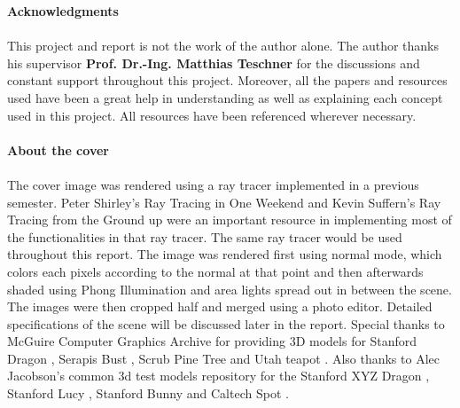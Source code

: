 \documentclass[11pt,a4paper]{article}
\begin{document}
\noindent
\textbf{\Large{Acknowledgments}}
\\~\\
This project and report is not the work of the author alone. The author thanks his supervisor \textbf{Prof.
	Dr.-Ing. Matthias Teschner} for the discussions and constant support throughout this project. Moreover, all the papers and resources used have been a great help in understanding as well as explaining each concept used in this project. All resources have been referenced wherever necessary.
\\~\\
\noindent
\textbf{\Large{About the cover}}
\\~\\
The cover image was rendered using a ray tracer implemented in a previous semester. Peter Shirley's Ray Tracing in One Weekend \cite{Shirley2020RTW1} and Kevin Suffern's Ray Tracing from the Ground up \cite{suffern2016ray} were an important resource in implementing most of the functionalities in that ray tracer. The same ray tracer would be used throughout this report. The image was rendered first using normal mode, which colors each pixels according to the normal at that point and then afterwards shaded using Phong Illumination and area lights spread out in between the scene. The images were then cropped half and merged using a photo editor. Detailed specifications of the scene will be discussed later in the report. Special thanks to McGuire Computer Graphics Archive \cite{McGuire2017Data} for providing 3D models for Stanford Dragon \cite{stanforddragon}, Serapis Bust \cite{serapis}, Scrub Pine Tree \cite{pinetree} and Utah teapot \cite{utahteapot}. Also thanks to Alec Jacobson's common 3d test models repository \cite{common3dmodels} for the Stanford XYZ Dragon \cite{stanfordxyzdragon}, Stanford Lucy \cite{stanfordlucy}, Stanford Bunny \cite{stanfordbunny} and Caltech Spot \cite{spot}.

\pagebreak
\tableofcontents
\pagebreak
\end{document}
